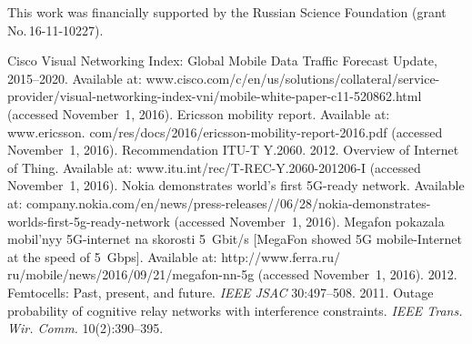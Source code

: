 
\vspace*{-12pt}

\Ack
\noindent
This work was financially supported by the Russian Science Foundation (grant  
No.\,16-11-10227).




  \begin{multicols}{2}

\renewcommand{\bibname}{\protect\rmfamily References}

{\small\frenchspacing
 {%
 \begin{thebibliography}{99}

Cisco Visual Networking Index: Global Mobile Data Traffic Forecast Update, 2015--2020. 
Available  at: {\sf  
www.cisco.com/c/en/us/solutions/collateral/service-provider/visual-networking-index-vni/mobile-white-paper-c11-520862.html} (accessed November~1, 2016).
Ericsson mobility report. Available at: {\sf
www.ericsson. com/res/docs/2016/ericsson-mobility-report-2016.pdf} (accessed November~1, 
2016).
Recommendation ITU-T Y.2060. 2012. Overview of Internet of Thing. Available at: {\sf 
www.itu.int/rec/T-REC-Y.2060-201206-I} (accessed November~1, 2016). 
Nokia demonstrates world's first 5G-ready network. Available at: {\sf 
company.nokia.com/en/news/press-releases//06/28/nokia-demonstrates-worlds-first-5g-ready-network} (accessed November~1, 2016). 
Megafon pokazala mobil'nyy 5G-internet na skorosti 5~Gbit/s [MegaFon showed 
5G mobile-Internet at the speed of 5~Gbps]. Available at: {\sf 
http://www.ferra.ru/ ru/mobile/news/2016/09/21/megafon-nn-5g} (accessed November~1, 2016).
 2012. Femtocells: Past, present, 
and future. \textit{IEEE JSAC} 30:497--508.
 2011. Outage probability of cognitive relay 
networks with interference constraints. \textit{IEEE Trans. Wir. Comm.} 10(2):390--395.




\end{thebibliography}}}
\end{multicols}
